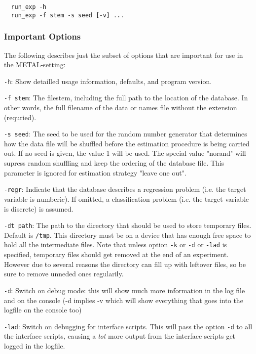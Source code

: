 \documentclass[a4paper,10pt,twoside]{article}
\newenvironment{optionlist}
{\begin{list}{}
    {\setlength{\itemsep}{0em plus0em minus0ex}
      \setlength{\parsep}{0ex}
      \setlength{\topsep}{0em}
      \setlength{\leftmargin}{2em}
      \setlength{\listparindent}{0em}
      \setlength{\itemindent}{-2em}
      \setlength{\partopsep}{0ex}
    }}
  {\end{list}}
\begin{document}
\begin{verbatim}
  run_exp -h
  run_exp -f stem -s seed [-v] ...
\end{verbatim}

\subsubsection{Important Options}

The following describes just the subset of options that 
are important for use in the METAL-setting:

\begin{optionlist}
\item \texttt{-h}:  Show detailled usage information, defaults, and
  program version. 
\item \texttt{-f stem}:  The filestem, including the full
path to the location of the database. In other words, the full
filename of the data or names file without the extension (requried).
\item \verb=-s seed=:  The seed to be used for the random number
generator that determines how the data file will be shuffled
before the estimation procedure is being carried out. If
no seed is given, the value 1 will be used. The special value
"norand" will supress random shuffling and keep the ordering 
of the database file. This parameter is ignored for estimation
strategy "leave one out". 
\item \verb=-regr=:  Indicate that the database describes a regression
  problem (i.e. the target variable is numberic). If omitted,
  a classification problem (i.e. the target variable is discrete)
  is assumed. 
\item \verb=-dt path=:  The path to the directory that should be used 
  to store temporary files. Default is \texttt{/tmp}. This 
  directory must be on a device that has enough free space to
  hold all the intermediate files. Note that unless option
  \texttt{-k} or \texttt{-d} or \texttt{-lad} is specified,
  temporary files should get removed at the end of an experiment.
  However due to several reasons the directory can fill up with
  leftover files, so be sure to remove unneded ones regularily.
\item \verb=-d=:  Switch on debug mode: this will show much more information
  in the log file and on the console (-d implies -v which will
  show everything that goes into the logfile on the console too) 
\item \verb=-lad=:  Switch on debugging for interface scripts. 
  This will pass the
  option \verb=-d= to all the interface scripts, causing a \emph{lot}
  more output from the interface scripts get logged in the logfile.
\end{optionlist}
\end{document}
